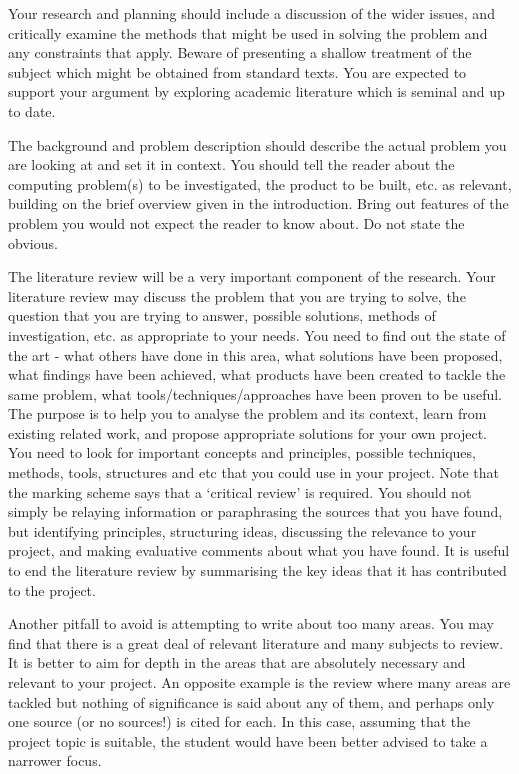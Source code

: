 {    Your research and planning should include a discussion of the wider issues, and critically examine the methods that might be used in solving the problem and any constraints
    that apply. Beware of presenting a shallow treatment of the subject which might be obtained from standard texts. You are expected to support your argument by exploring
    academic literature which is seminal and up to date.

    The background and problem description should describe the actual problem you are looking at and set it in context. You should tell the reader about the computing problem(s)
    to be investigated, the product to be built, etc. as relevant, building on the brief overview given in the introduction. Bring out features of the problem you would not
    expect the reader to know about. Do not state the obvious.

    The literature review will be a very important component of the research. Your literature review may discuss the problem that you are trying to solve, the question that
    you are trying to answer, possible solutions, methods of investigation, etc. as appropriate to your needs. You need to find out the state of the art - what others have
    done in this area, what solutions have been proposed, what findings have been achieved, what products have been created to tackle the same problem, what
    tools/techniques/approaches have been proven to be useful. The purpose is to help you to analyse the problem and its context, learn from existing related work, and
    propose appropriate solutions for your own project. You need to look for important concepts and principles, possible techniques, methods, tools, structures and etc that
    you could use in your project.
    Note that the marking scheme says that a ‘critical review’ is required. You should not simply be relaying information or paraphrasing the sources that you have found, but
    identifying principles, structuring ideas, discussing the relevance to your project, and making evaluative comments about what you have found. It is useful to end the
    literature review by summarising the key ideas that it has contributed to the project.

    Another pitfall to avoid is attempting to write about too many areas. You may find that there is a great deal of relevant literature and many subjects to review. It is
    better to aim for depth in the areas that are absolutely necessary and relevant to your project. An opposite example is the review where many areas are tackled but nothing
    of significance is said about any of them, and perhaps only one source (or no sources!) is cited for each. In this case, assuming that the project topic is suitable, the
    student would have been better advised to take a narrower focus.

}
